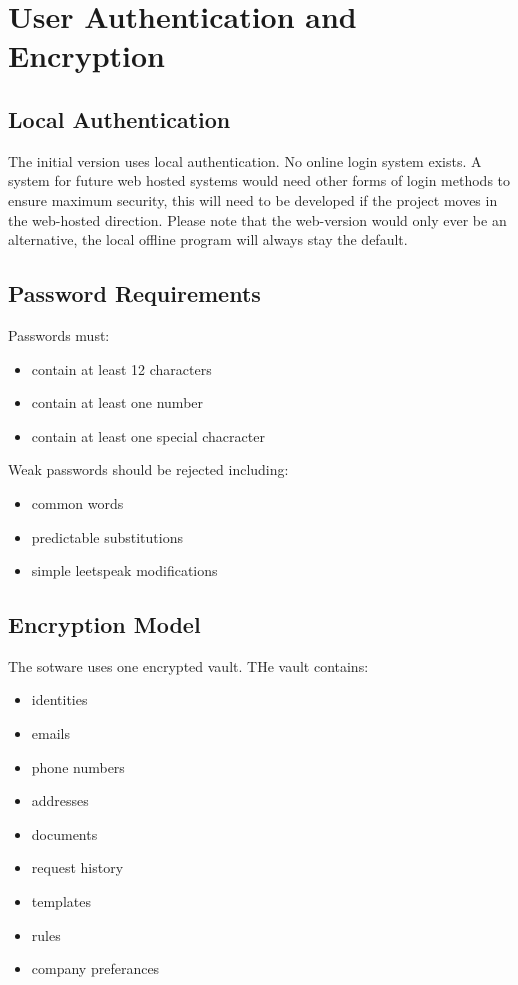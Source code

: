 
\chapter{User Authentication and Encryption}

\section{Local Authentication}
The initial version uses local authentication.
No online login system exists.
A system for future web hosted systems would need other forms of login methods to ensure maximum security, this will need to be developed if the project moves in the web-hosted direction. Please note that the web-version would only ever be an alternative, the local offline program will always stay the default.

\section{Password Requirements}

Passwords must:
\begin{itemize}
	\item contain at least 12 characters
	\item contain at least one number
	\item contain at least one special chacracter
\end{itemize}

Weak passwords should be rejected including:
\begin{itemize}
	\item common words
	\item predictable substitutions
	\item simple leetspeak modifications
\end{itemize}


\section{Encryption Model}
The sotware uses one encrypted vault. THe vault contains:
\begin{itemize}
	\item identities
	\item emails
	\item phone numbers
	\item addresses
	\item documents
	\item request history
	\item templates
	\item rules
	\item company preferances
\end{itemize}

